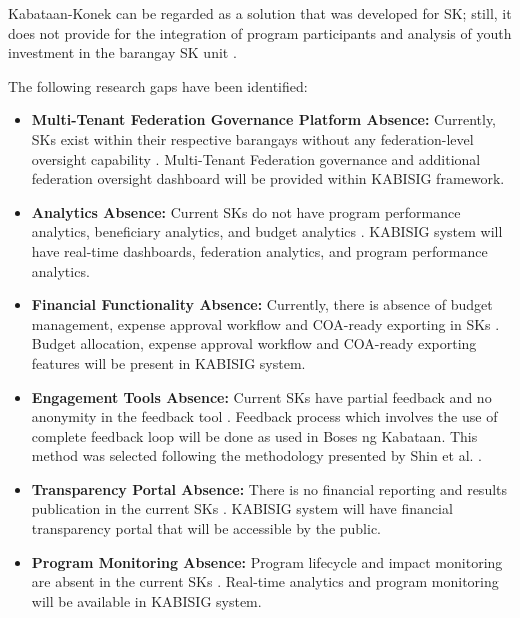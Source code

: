 \hspace*{\parindent}Kabataan-Konek can be regarded as a solution that was developed for SK; still, it does not provide for the integration of program participants and analysis of youth investment in the barangay SK unit \cite{E,J,K,AC}.
\vspace{5mm}

\hspace*{\parindent}The following research gaps have been identified:
\vspace{5mm}

\begin{itemize}
    \item \textbf{Multi-Tenant Federation Governance Platform Absence:} Currently, SKs exist within their respective barangays without any federation-level oversight capability \cite{E,J,K,AC}. Multi-Tenant Federation governance and additional federation oversight dashboard will be provided within KABISIG framework.
    \item \textbf{Analytics Absence:} Current SKs do not have program performance analytics, beneficiary analytics, and budget analytics \cite{A,E,AM}. KABISIG system will have real-time dashboards, federation analytics, and program performance analytics.
    \item \textbf{Financial Functionality Absence:} Currently, there is absence of budget management, expense approval workflow and COA-ready exporting in SKs \cite{J,AP,AR}. Budget allocation, expense approval workflow and COA-ready exporting features will be present in KABISIG system.
    \item \textbf{Engagement Tools Absence:} Current SKs have partial feedback and no anonymity in the feedback tool \cite{G,I,S,AX}. Feedback process which involves the use of complete feedback loop will be done as used in Boses ng Kabataan. This method was selected following the methodology presented by Shin et al. \cite{AX}.
    \item \textbf{Transparency Portal Absence:} There is no financial reporting and results publication in the current SKs \cite{J,S,AR}. KABISIG system will have financial transparency portal that will be accessible by the public.
    \item \textbf{Program Monitoring Absence:} Program lifecycle and impact monitoring are absent in the current SKs \cite{J,AB,AP}. Real-time analytics and program monitoring will be available in KABISIG system.
\end{itemize}
\vspace{5mm}

